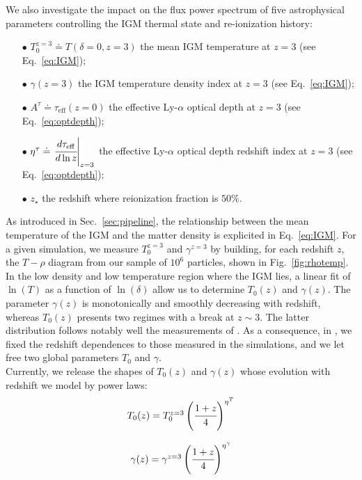 We also investigate the impact on the flux power spectrum of five astrophysical parameters controlling the IGM thermal state and re-ionization history: \\
\begin{itemize}
\item[$\bullet$] $T^{z=3}_0 \doteq T(\delta=0, z=3)$ the mean IGM temperature at $z=3$ (see Eq.~\ref{eq:IGM});\\
\item[$\bullet$] $\gamma(z=3)$ the IGM temperature density index at $z=3$ (see Eq.~\ref{eq:IGM});\\
\item[$\bullet$] $A^\tau \doteq \tau_{\mathrm{eff}}(z=0)$ the effective Ly-$\alpha$ optical depth at $z=3$ (see Eq.~\ref{eq:optdepth});\\
\item[$\bullet$] $\eta^\tau \doteq \left. \cfrac{d \tau_{\mathrm{eff}}}{d \ln z} \right\vert_{z=3}$ the effective Ly-$\alpha$ optical depth redshift index at $z=3$ (see Eq.~\ref{eq:optdepth}); \\
\item[$\bullet$] $z_\star$ the redshift where reionization fraction is $50\%$. \\
\end{itemize} 

As introduced in Sec.~\ref{sec:pipeline}, the relationship between the mean temperature of the IGM and the matter density is explicited in Eq.~\ref{eq:IGM}. For a given simulation, we measure $T_0^{z=3}$ and $\gamma^{z=3}$ by building, for each redshift $z$, the $ T- \rho$ diagram from our sample of $10^6$ particles, shown in Fig.~\ref{fig:rhotemp}. In the low density and low temperature region where the IGM lies, a linear fit of $\ln(T)$ as a function of $\ln(\delta)$ allow us to determine $T_0(z)$ and $\gamma(z)$. The parameter $\gamma(z)$  is monotonically and smoothly decreasing with redshift,  whereas  $T_0(z)$  presents two regimes with a break at $z\sim 3$. The latter distribution follows notably well the measurements of \cite{Becker2011}. As a consequence, in \cite{Palanque2015a}, we fixed the redshift dependences to those measured in the simulations, and we let free two global parameters $T_0$ and $\gamma$. \\

Currently, we release the shapes of $T_0(z)$ and $\gamma(z)$ whose evolution with redshift we model by power laws:\\

\begin{equation}
\label{eq:IGM_new_model}
\begin{array}{c}
T_0(z) = T_0^{z=3} \left( \cfrac{1+z}{4} \right)^{\eta^T} \\
\\
\gamma (z) = \gamma^{z=3} \left( \cfrac{1+z}{4} \right)^{\eta^\gamma}
\end{array}
\end{equation}\\

